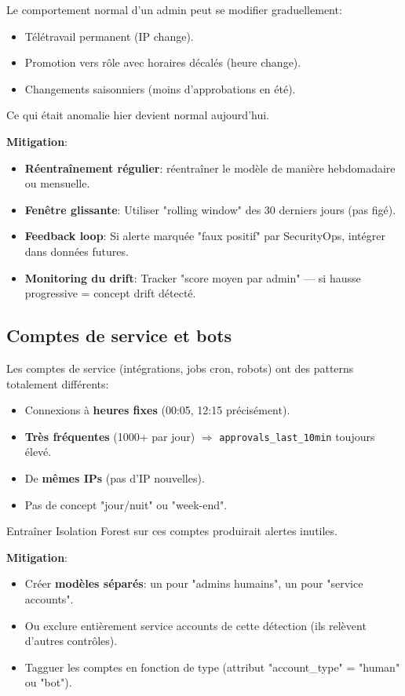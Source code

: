 Le comportement normal d'un admin peut se modifier graduellement:
\begin{itemize}
	\item Télétravail permanent (IP change).
	\item Promotion vers rôle avec horaires décalés (heure change).
	\item Changements saisonniers (moins d'approbations en été).
\end{itemize}

Ce qui était anomalie hier devient normal aujourd'hui.

\textbf{Mitigation}:
\begin{itemize}
	\item \textbf{Réentraînement régulier}: réentraîner le modèle de manière hebdomadaire ou mensuelle.
	\item \textbf{Fenêtre glissante}: Utiliser "rolling window" des 30 derniers jours (pas figé).
	\item \textbf{Feedback loop}: Si alerte marquée "faux positif" par SecurityOps, intégrer dans données futures.
	\item \textbf{Monitoring du drift}: Tracker "score moyen par admin" — si hausse progressive = concept drift détecté.
\end{itemize}

\subsection{Comptes de service et bots}

Les comptes de service (intégrations, jobs cron, robots) ont des patterns totalement différents:
\begin{itemize}
	\item Connexions à \textbf{heures fixes} (00:05, 12:15 précisément).
	\item \textbf{Très fréquentes} (1000+ par jour) $\Rightarrow$ \texttt{approvals\_last\_10min} toujours élevé.
	\item De \textbf{mêmes IPs} (pas d'IP nouvelles).
	\item Pas de concept "jour/nuit" ou "week-end".
\end{itemize}

Entraîner Isolation Forest sur ces comptes produirait alertes inutiles.

\textbf{Mitigation}:
\begin{itemize}
	\item Créer \textbf{modèles séparés}: un pour "admins humains", un pour "service accounts".
	\item Ou exclure entièrement service accounts de cette détection (ils relèvent d'autres contrôles).
	\item Tagguer les comptes en fonction de type (attribut "account\_type" = "human" ou "bot").
\end{itemize}

